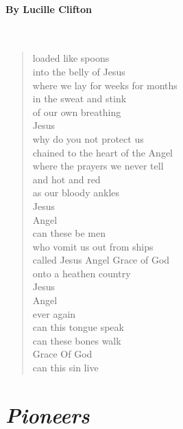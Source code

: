 \documentclass[12pt, openany, letterpaper]{memoir}
\begin{document}
\paragraph{By Lucille Clifton}~
\begin{verse}
	loaded like spoons\\
	into the belly of Jesus\\
	where we lay for weeks for months\\
	in the sweat and stink\\
	of our own breathing\\
	Jesus\\
	why do you not protect us\\
	chained to the heart of the Angel\\
	where the prayers we never tell\\
	and hot and red\\
	as our bloody ankles\\
	Jesus\\
	Angel\\
	can these be men\\
	who vomit us out from ships\\
	called Jesus    Angel    Grace of God\\
	onto a heathen country\\
	Jesus\\
	Angel\\
	ever again\\
	can this tongue speak\\
	can these bones walk\\
	Grace Of God\\
	can this sin live
\end{verse}

\newpage
\section*{\emph{Pioneers}}
\end{document}
